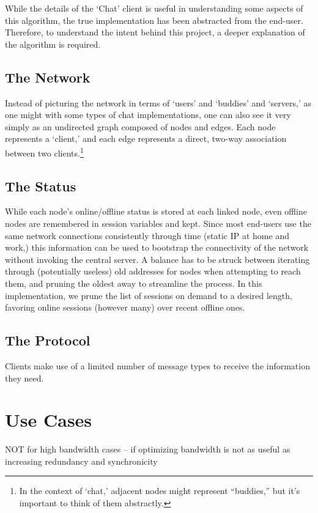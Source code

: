 \documentclass[11pt]{article}
\begin{document}
While the details of the `Chat' client is useful in understanding some aspects of this algorithm, the true implementation has been abstracted from the end-user. Therefore, to understand the intent behind this project, a deeper explanation of the algorithm is required.

\subsection{The Network}

Instead of picturing the network in terms of `users' and `buddies' and `servers,' as one might with some types of chat implementations, one can also see it very simply as an undirected graph composed of nodes and edges. Each node represents a `client,' and each edge represents a direct, two-way association between two clients.\footnote{In the context of `chat,' adjacent nodes might represent ``buddies,'' but it's important to think of them abstractly.}

\subsection{The Status}
While each node's online/offline status is stored at each linked node, even offline nodes are remembered in session variables and kept. Since most end-users use the same network connections consistently through time (static IP at home and work,) this information can be used to bootstrap the connectivity of the network without invoking the central server. A balance has to be struck between iterating through (potentially useless) old addresses for nodes when attempting to reach them, and pruning the oldest away to streamline the process. In this implementation, we prune the list of sessions on demand to a desired length, favoring online sessions (however many) over recent offline ones.
   
\subsection{The Protocol}

Clients make use of a limited number of message types to receive the information they need.



\section{Use Cases}

NOT for high bandwidth cases -- if optimizing bandwidth is not as useful as increasing redundancy and synchronicity
\end{document}
